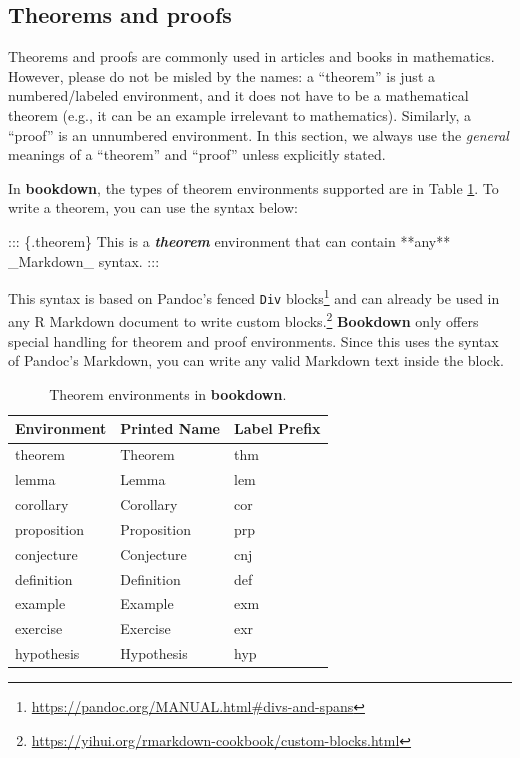 \documentclass[
  12pt,
]{krantz}
\newenvironment{Shaded}{\begin{snugshade}}{\end{snugshade}}
\newcommand{\InformationTok}[1]{\textcolor[rgb]{0.56,0.35,0.01}{\textbf{\textit{#1}}}}
\newcommand{\NormalTok}[1]{#1}
\renewcommand{\href}[2]{#2\footnote{\url{#1}}}
\theoremstyle{definition}
\theoremstyle{definition}
\theoremstyle{definition}
\theoremstyle{definition}
\theoremstyle{remark}
\begin{document}
\subsection{Theorems and proofs}\label{theorems}

Theorems and proofs are commonly used in articles and books in mathematics. However, please do not be misled by the names: a ``theorem'' is just a numbered/labeled environment, and it does not have to be a mathematical theorem (e.g., it can be an example irrelevant to mathematics). Similarly, a ``proof'' is an unnumbered environment. In this section, we always use the \emph{general} meanings of a ``theorem'' and ``proof'' unless explicitly stated.

In \textbf{bookdown}, the types of theorem environments supported are in Table \ref{tab:theorem-envs}. To write a theorem, you can use the syntax below:

\begin{Shaded}
\begin{Highlighting}[]
\NormalTok{::: \{.theorem\}}
\NormalTok{This is a }\InformationTok{\textasciigrave{}theorem\textasciigrave{}}\NormalTok{ environment that can contain **any**}
\NormalTok{\_Markdown\_ syntax.}
\NormalTok{:::}
\end{Highlighting}
\end{Shaded}

This syntax is based on Pandoc's \href{https://pandoc.org/MANUAL.html\#divs-and-spans}{fenced \texttt{Div} blocks} and can already be used in any R Markdown document to write \href{https://yihui.org/rmarkdown-cookbook/custom-blocks.html}{custom blocks.} \textbf{Bookdown} only offers special handling for theorem and proof environments. Since this uses the syntax of Pandoc's Markdown, you can write any valid Markdown text inside the block.



\begin{table}

\caption{\label{tab:theorem-envs}Theorem environments in \textbf{bookdown}.}
\centering
\begin{tabular}[t]{lll}
\toprule
Environment & Printed Name & Label Prefix\\
\midrule
theorem & Theorem & thm\\
lemma & Lemma & lem\\
corollary & Corollary & cor\\
proposition & Proposition & prp\\
conjecture & Conjecture & cnj\\
\addlinespace
definition & Definition & def\\
example & Example & exm\\
exercise & Exercise & exr\\
hypothesis & Hypothesis & hyp\\
\bottomrule
\end{tabular}
\end{table}
\end{document}
